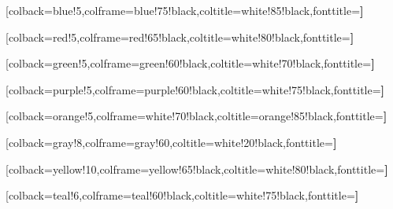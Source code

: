 \usepackage{listings}
\usepackage{listingsutf8}
\renewcommand{\lstlistingname}{Scripts}%
\renewcommand{\lstlistlistingname}{Lista de \lstlistingname }%



\usepackage{coloredtheorem}
%
[colback=blue!5,colframe=blue!75!black,coltitle=white!85!black,fonttitle=\bfseries]

[colback=red!5,colframe=red!65!black,coltitle=white!80!black,fonttitle=\bfseries]

[colback=green!5,colframe=green!60!black,coltitle=white!70!black,fonttitle=\bfseries]

[colback=purple!5,colframe=purple!60!black,coltitle=white!75!black,fonttitle=\bfseries]

[colback=orange!5,colframe=white!70!black,coltitle=orange!85!black,fonttitle=\bfseries]

[colback=gray!8,colframe=gray!60,coltitle=white!20!black,fonttitle=\bfseries]

[colback=yellow!10,colframe=yellow!65!black,coltitle=white!80!black,fonttitle=\bfseries]

[colback=teal!6,colframe=teal!60!black,coltitle=white!75!black,fonttitle=\bfseries]

\let\theorem     \cthteorema
\let\endtheorem  \endcthteorema
\let\definition  \cthdefinicion
\let\enddefinition\endcthdefinicion
\let\corollary   \cthcorolario
\let\endcorollary\endcthcorolario
\let\lemma       \cthlema
\let\endlemma    \endcthlema
\let\proposition \cthproposicion
\let\endproposition\endcthproposicion
\let\example     \cthejemplo
\let\endexample  \endcthejemplo
\let\remark      \cthnota
\let\endremark   \endcthnota